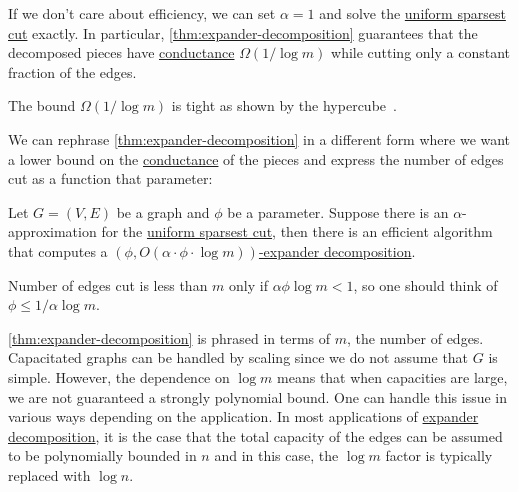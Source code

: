If we don't care about efficiency, we can set \(\alpha = 1\) and solve the \hyperref[prb:sparsest-cut]{uniform sparsest cut} exactly. In particular, \autoref{thm:expander-decomposition} guarantees that the decomposed pieces have \hyperref[def:conductance]{conductance} \(\Omega (1 / \log m)\) while cutting only a constant fraction of the edges.

\begin{note}
	The bound \(\Omega (1 / \log m)\) is tight as shown by the hypercube~\cite{alev2017graph}.
\end{note}

We can rephrase \autoref{thm:expander-decomposition} in a different form where we want a lower bound on the \hyperref[def:conductance]{conductance} of the pieces and express the number of edges cut as a function that parameter:

\begin{corollary}\label{col:expander-decomposition}
	Let \(G = (V, E)\) be a graph and \(\phi \) be a parameter. Suppose there is an \(\alpha \)-approximation for the \hyperref[prb:sparsest-cut]{uniform sparsest cut}, then there is an efficient algorithm that computes a \hyperref[def:expander-decomposition]{\((\phi , O(\alpha \cdot \phi \cdot \log m))\)-expander decomposition}.
\end{corollary}

\begin{note}
	Number of edges cut is less than \(m\) only if \(\alpha \phi \log m < 1\), so one should think of \(\phi \leq 1 / \alpha \log m\).
\end{note}

\begin{remark}
	\autoref{thm:expander-decomposition} is phrased in terms of \(m\), the number of edges. Capacitated graphs can be handled by scaling since we do not assume that \(G\) is simple. However, the dependence on \(\log m\) means that when capacities are large, we are not guaranteed a strongly polynomial bound. One can handle this issue in various ways depending on the application. In most applications of \hyperref[def:expander-decomposition]{expander decomposition}, it is the case that the total capacity of the edges can be assumed to be polynomially bounded in \(n\) and in this case, the \(\log m\) factor is typically replaced with \(\log n\).
\end{remark}

